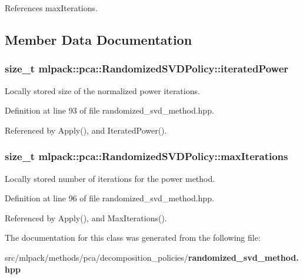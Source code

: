 References max\+Iterations.



\subsection{Member Data Documentation}
\subsubsection[{iterated\+Power}]{\setlength{\rightskip}{0pt plus 5cm}size\+\_\+t mlpack\+::pca\+::\+Randomized\+S\+V\+D\+Policy\+::iterated\+Power\hspace{0.3cm}{\ttfamily [private]}}\label{classmlpack_1_1pca_1_1RandomizedSVDPolicy_a388d19076617e10e1ec6192de64c09ee}


Locally stored size of the normalized power iterations. 



Definition at line 93 of file randomized\+\_\+svd\+\_\+method.\+hpp.



Referenced by Apply(), and Iterated\+Power().

\subsubsection[{max\+Iterations}]{\setlength{\rightskip}{0pt plus 5cm}size\+\_\+t mlpack\+::pca\+::\+Randomized\+S\+V\+D\+Policy\+::max\+Iterations\hspace{0.3cm}{\ttfamily [private]}}\label{classmlpack_1_1pca_1_1RandomizedSVDPolicy_a9a0240b2aed91888c72e1b0331bab409}


Locally stored number of iterations for the power method. 



Definition at line 96 of file randomized\+\_\+svd\+\_\+method.\+hpp.



Referenced by Apply(), and Max\+Iterations().



The documentation for this class was generated from the following file\+:\begin{DoxyCompactItemize}
\item 
src/mlpack/methods/pca/decomposition\+\_\+policies/{\bf randomized\+\_\+svd\+\_\+method.\+hpp}\end{DoxyCompactItemize}
